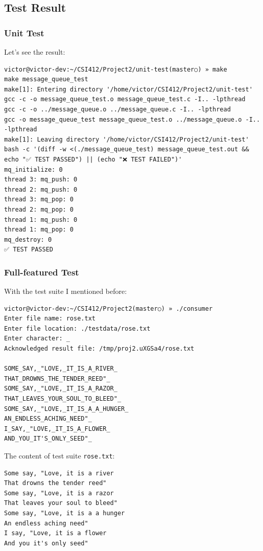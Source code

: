 \documentclass{article}
\begin{document}
\subsection{Test Result}
\subsubsection{Unit Test}
Let's see the result:
\begin{verbatim}
victor@victor-dev:~/CSI412/Project2/unit-test(master○) » make
make message_queue_test
make[1]: Entering directory '/home/victor/CSI412/Project2/unit-test'
gcc -c -o message_queue_test.o message_queue_test.c -I.. -lpthread
gcc -c -o ../message_queue.o ../message_queue.c -I.. -lpthread
gcc -o message_queue_test message_queue_test.o ../message_queue.o -I.. -lpthread
make[1]: Leaving directory '/home/victor/CSI412/Project2/unit-test'
bash -c '(diff -w <(./message_queue_test) message_queue_test.out &&
echo "✅ TEST PASSED") || (echo "❌ TEST FAILED")'
mq_initialize: 0
thread 3: mq_push: 0
thread 2: mq_push: 0
thread 3: mq_pop: 0
thread 2: mq_pop: 0
thread 1: mq_push: 0
thread 1: mq_pop: 0
mq_destroy: 0
✅ TEST PASSED
\end{verbatim}
\subsubsection{Full-featured Test}

With the test suite I mentioned before:
\begin{verbatim}
victor@victor-dev:~/CSI412/Project2(master○) » ./consumer                                   
Enter file name: rose.txt
Enter file location: ./testdata/rose.txt
Enter character: _
Acknowledged result file: /tmp/proj2.uXGSa4/rose.txt

SOME_SAY,_"LOVE,_IT_IS_A_RIVER_
THAT_DROWNS_THE_TENDER_REED"_
SOME_SAY,_"LOVE,_IT_IS_A_RAZOR_
THAT_LEAVES_YOUR_SOUL_TO_BLEED"_
SOME_SAY,_"LOVE,_IT_IS_A_A_HUNGER_
AN_ENDLESS_ACHING_NEED"_
I_SAY,_"LOVE,_IT_IS_A_FLOWER_
AND_YOU_IT'S_ONLY_SEED"_
\end{verbatim}

The content of test suite \texttt{rose.txt}:
\begin{verbatim}
Some say, "Love, it is a river
That drowns the tender reed"
Some say, "Love, it is a razor
That leaves your soul to bleed"
Some say, "Love, it is a a hunger
An endless aching need"
I say, "Love, it is a flower
And you it's only seed"
\end{verbatim}
\end{document}
